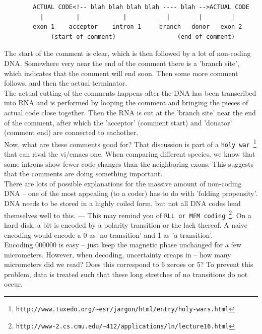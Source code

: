 \documentclass[11pt,twoside,a4paper]{article}
\begin{document}
\begin{center}
	\begin{verbatim}
		ACTUAL CODE<!-- blah blah blah blah ---- blah -->ACTUAL CODE
		  |         |            |           |        |        |
		exon 1    acceptor    intron 1     branch   donor   exon 2
		     (start of comment)                 (end of comment)
	\end{verbatim}
\end{center}

The start of the comment is clear, which is then followed by a lot of non-coding DNA. Somewhere very near the end of the comment there is a 'branch site', which indicates that the comment will end soon. Then some more comment follows, and then the actual terminator. ~\\

The actual cutting of the comments happens after the DNA has been transcribed into RNA and is performed by looping the comment and bringing the pieces of actual code close together. Then the RNA is cut at the 'branch site' near the end of the comment, after which the 'acceptor' (comment start) and 'donator' (comment end) are connected to eachother. ~\\

Now, what are these comments good for? That discussion is part of a \texttt{holy war}~\footnote{\texttt{http://www.tuxedo.org/\textasciitilde esr/jargon/html/entry/holy-wars.html}} that can rival the vi/emacs one. When comparing different species, we know that some introns show fewer code changes than the neighboring exons. This suggests that the comments are doing something important. ~\\

There are lots of possible explanations for the massive amount of non-coding DNA -- one of the most appealing (to a coder) has to do with 'folding propensity'. DNA needs to be stored in a highly coiled form, but not all DNA codes lend themselves well to this. --- This may remind you of \texttt{RLL or MFM coding}~\footnote{\texttt{http://www-2.cs.cmu.edu/\textasciitilde 412/applications/ln/lecture16.html}}. On a hard disk, a bit is encoded by a polarity transition or the lack thereof. A naive encoding would encode a 0 as 'no transition' and 1 as 'a transition'. ~\\

Encoding 000000 is easy -- just keep the magnetic phase unchanged for a few micrometers. However, when decoding, uncertainty creaps in -- how many micrometers did we read? Does this correspond to 6 zeroes or 5? To prevent this problem, data is treated such that these long stretches of no transitions do not occur. ~\\
\end{document}
